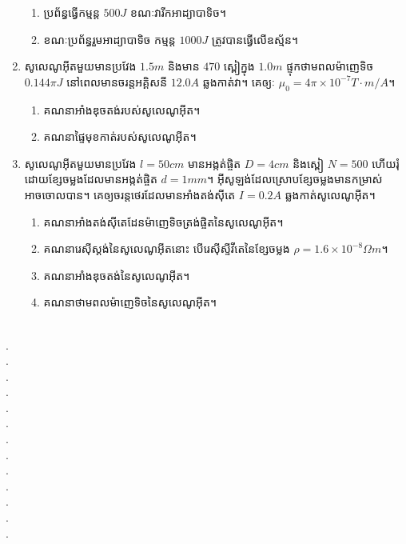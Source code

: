 \documentclass{officialexam}
\begin{document}
\begin{enumerate}[I]
	\begin{enumerate}[k]
		\item ប្រព័ន្ធធ្វើកម្មន្ត $500J$ ខណៈវារីកអាដ្យាបាទិច។
		\item ខណៈប្រព័ន្ធរួមអាដ្យាបាទិច កម្មន្ត $1000J$ ត្រូវបានធ្វើលើឧស្ម័ន។
	\end{enumerate}
	\item សូលេណូអុីតមួយមានប្រវែង $1.5m$ និងមាន $470$ ស្ពៀក្នុង $1.0m$ ផ្ទុកថាមពលម៉ាញេទិច $0.144\pi J$ នៅពេលមានចរន្តអគ្គិសនី $12.0A$ ឆ្លងកាត់វា។ គេឲ្យៈ $\mu_0=4\pi\times10^{-7}T\cdot m/A$។
	\begin{enumerate}[k,2]
		\item គណនាអាំងឌុចតង់របស់សូលេណូអុីត។
		\item គណនាផ្ទៃមុខកាត់របស់សូលេណូអុីត។
	\end{enumerate}
	\item សូលេណូអុីតមួយមានប្រវែង $l=50cm$ មានអង្កត់ផ្ចិត $D=4cm$ និងស្ពៀ $N=500$ ហើយរុំដោយខ្សែចម្លងដែលមានអង្កត់ផ្ចិត $d=1mm$។ អុីសូឡង់ដែលស្រោបខ្សែចម្លងមានកម្រាស់អាចចោលបាន។ គេឲ្យចរន្តថេរដែលមានអាំងតង់សុីតេ $I=0.2A$ ឆ្លងកាត់សូលេណូអុីត។
	\begin{enumerate}[k]
		\item គណនាអាំងតង់សុីតេដែនម៉ាញេទិចត្រង់ផ្ចិតនៃសូលេណូអុីត។
		\item គណនារេសុីស្តង់នៃសូលេណូអុីតនោះ បើរេសុីស្ទីវីតេនៃខ្សែចម្លង $\rho=1.6\times10^{-8}\Omega m$។
		\item គណនាអាំងឌុចតង់នៃសូលេណូអុីត។
		\item គណនាថាមពលម៉ាញេទិចនៃសូលេណូអុីត។
	\end{enumerate}
\end{enumerate}\newpage
{}\\
{\color{white}.}\dotfill\\
{\color{white}.}\dotfill\\
{\color{white}.}\dotfill
\\
{\color{white}.}\dotfill\\
{\color{white}.}\dotfill\\
{\color{white}.}\dotfill
\\
{\color{white}.}\dotfill\\
{\color{white}.}\dotfill\\
{\color{white}.}\dotfill
\\
{\color{white}.}\dotfill\\
{\color{white}.}\dotfill\\
{\color{white}.}\dotfill
\\
{\color{white}.}\dotfill\\
\end{document}
